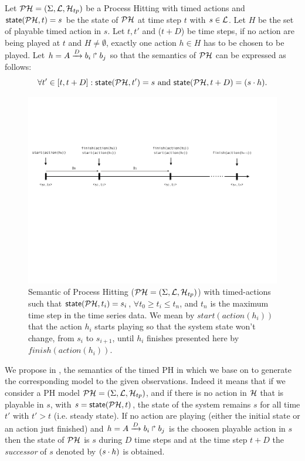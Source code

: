\begin{definition}
\label{def:semantic}
Let $\mathcal{PH} = (\Sigma,\mathcal{L},\mathcal{H}_{tp})$ be a Process Hitting with timed actions and $\textsf{state}(\mathcal{PH}, t)=s$ be the state of $\mathcal{PH}$ at time step $t$ with $s \in \mathcal{L}$. Let $H$ be the set of playable timed action in $s$.
Let $t, t'$ and ($t+D$) be time steps, if no action are being played at $t$ and $H \not = \emptyset$, exactly one action $h \in H$ has to be chosen to be played. Let $h = A\xrightarrow{D} b_i \Rsh b_j$ so that the semantics of $\mathcal{PH}$ can be expressed as follows:
$$ \forall t' \in [t, t+D ] : \textsf{state}(\mathcal{PH}, t')=s \text{ and } \textsf{state}(\mathcal{PH}, t+D)=(s \cdot h).$$
\end{definition}

\begin{figure}
\includegraphics[width=1\linewidth]{images/semantic-timed-PH}
\caption{Semantic of Process Hitting ($\mathcal{PH} = (\Sigma,\mathcal{L},\mathcal{H}_{tp})$) with timed-actions such that $\textsf{state}(\mathcal{PH}, t_i)=s_i$, $ \forall t_0 \geq t_i \leq t_n$, and $t_n$ is the maximum time step in the time series data. We mean by $start(action(h_i))$ that the action $h_i$ starts playing so that the system state won't change, from $s_i$ to $s_{i+1}$, until $h_i$ finishes presented here by $finish(action(h_i))$.}
\end{figure}

We propose in , the semantics of the timed PH in which we base on to generate the corresponding model to the given observations. Indeed it means that if we consider a PH model $\mathcal{PH} = (\Sigma,\mathcal{L},\mathcal{H}_{tp})$, and if there is no action in $\mathcal{H}$ that is playable in $s$, with $s=\textsf{state}(\mathcal{PH}, t)$, the state of the system remains $s$ for all time $t'$ with $t' > t$ (i.e. steady state). If no action are playing (either the initial state or an action just finished) and $h = A\xrightarrow{D} b_i \Rsh b_j$ is the choosen playable action in $s$ then the state of $\mathcal{PH}$ is $s$ during $D$ time steps and at the time step $t+D$
the \emph{successor} of $s$ denoted by $(s \cdot h)$ is obtained.
\\

